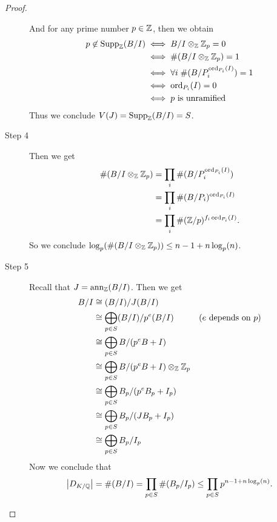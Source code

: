 \begin{proof}
\begin{description}
And for any prime number $p \in {\mathbb Z}$, then we obtain
\begin{align*}
  p \not\in \operatorname{Supp}_{{\mathbb Z}}(B/I) &\iff B/I \otimes_{{\mathbb Z}} {\mathbb Z}_p = 0 \\
  &\iff \#(B/I \otimes_{{\mathbb Z}} {\mathbb Z}_p ) = 1 \\
  &\iff \forall i \; \#(B  / P_i^{\operatorname{ord}_{P_i}(I) }) = 1 \\
  &\iff \operatorname{ord}_{P_i}(I) = 0 \\
  &\iff \text{$p$ is unramified}
  \end{align*}
  Thus we conclude $V(J) = \operatorname{Supp}_{{\mathbb Z}} (B/I) = S$.
  \item[Step 4] Then we get
  \begin{align*}
    \#(B/I \otimes_{{\mathbb Z}} {\mathbb Z}_p ) &= \prod_i \#( B/P_i^{\operatorname{ord}_{P_i}(I) } )  \\
    &= \prod_i \#( B/P_i)^{\operatorname{ord}_{P_i}(I) }   \\
    &= \prod_i \#( {\mathbb Z}/p)^{f_i \operatorname{ord}_{P_i}(I) }.
  \end{align*}
  So we conclude $\log_p( \#(B/I \otimes_{{\mathbb Z}} {\mathbb Z}_p ) ) \leq n - 1 + n \log_p(n)$.
  \item[Step 5] Recall that $J = \operatorname{ann}_{{\mathbb Z}}(B/I)$. Then we get
  \begin{align*}
    B/I &\cong (B/I )/ J (B/I) \\
    &\cong \bigoplus_{p \in S} (B/I) / p^e (B/I) &(\text{$e$ depends on $p$}) \\
    &\cong \bigoplus_{p \in S} B /( p^e B+ I) \\
    &\cong \bigoplus_{p \in S} B /( p^e B+ I) \otimes_{{\mathbb Z}} {\mathbb Z}_p \\
    &\cong \bigoplus_{p \in S} B_p /( p^e B_p+ I_p) \\
        &\cong \bigoplus_{p \in S} B_p /( J B_p+ I_p) \\
        &\cong \bigoplus_{p \in S} B_p / I_p  \\
  \end{align*}
  Now we conclude that
  \[
  \left \lvert  D_{K/{\mathbb Q}} \right \rvert = \#(B/I) = \prod_{p \in S} \#(B_p/I_p) \leq \prod_{p \in S} p^{n-1+n\log_p(n)}.
  \]
\end{description}
\end{proof}
